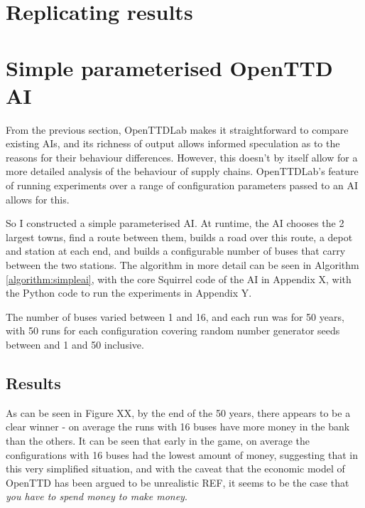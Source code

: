 \documentclass[logo,msc,dsti]{infthesis}    %
\begin{document}
\section{Replicating results}


\section{Simple parameterised OpenTTD AI}

From the previous section, OpenTTDLab makes it straightforward to compare existing AIs, and its richness of output allows informed speculation as to the reasons for their behaviour differences. However, this doesn't by itself allow for a more detailed analysis of the behaviour of supply chains. OpenTTDLab's feature of running experiments over a range of configuration parameters passed to an AI allows for this.

So I constructed a simple parameterised AI. At runtime, the AI chooses the 2 largest towns, find a route between them, builds a road over this route, a depot and station at each end, and builds a configurable number of buses that carry between the two stations. The algorithm in more detail can be seen in Algorithm \ref{algorithm:simpleai}, with the core Squirrel code of the AI in Appendix X, with the Python code to run the experiments in Appendix Y.

The number of buses varied between 1 and 16, and each run was for 50 years, with 50 runs for each configuration covering random number generator seeds between and 1 and 50 inclusive.

\subsection{Results}

As can be seen in Figure XX, by the end of the 50 years, there appears to be a clear winner - on average the runs with 16 buses have more money in the bank than the others. It can be seen that early in the game, on average the configurations with 16 buses had the lowest amount of money, suggesting that in this very simplified situation, and with the caveat that the economic model of OpenTTD has been argued to be unrealistic REF, it seems to be the case that \emph{you have to spend money to make money}.
\end{document}
